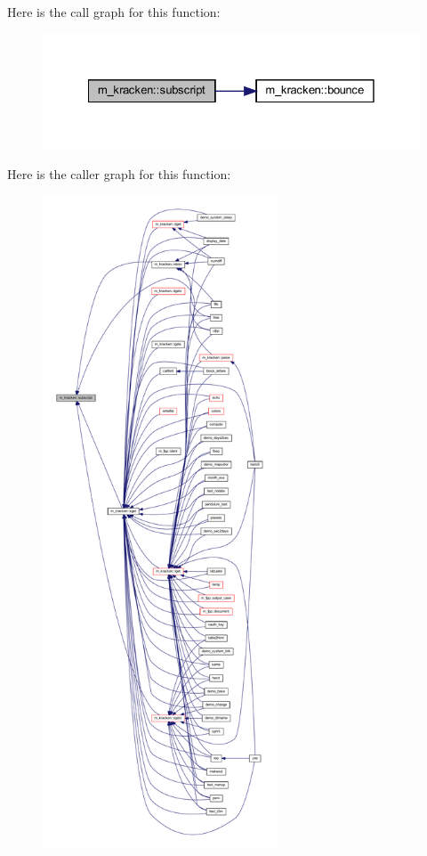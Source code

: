 Here is the call graph for this function\+:
\nopagebreak
\begin{figure}[H]
\begin{center}
\leavevmode
\includegraphics[width=328pt]{namespacem__kracken_a9e2129d174220802486cc2dc7e0cc443_cgraph}
\end{center}
\end{figure}
Here is the caller graph for this function\+:
\nopagebreak
\begin{figure}[H]
\begin{center}
\leavevmode
\includegraphics[height=550pt]{namespacem__kracken_a9e2129d174220802486cc2dc7e0cc443_icgraph}
\end{center}
\end{figure}


